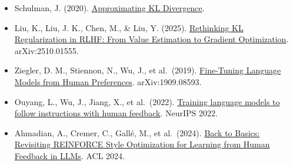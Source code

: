 \vspace{0.25em}
\begin{itemize}
\tightlist
\item
  Schulman, J. (2020). \href{http://joschu.net/blog/kl-approx.html}{Approximating KL Divergence}.
\item
  Liu, K., Liu, J. K., Chen, M., \& Liu, Y. (2025). \href{https://arxiv.org/abs/2510.01555}{Rethinking KL Regularization in RLHF: From Value Estimation to Gradient Optimization}. arXiv:2510.01555.
\item
  Ziegler, D. M., Stiennon, N., Wu, J., et al.~(2019). \href{https://arxiv.org/abs/1909.08593}{Fine-Tuning Language Models from Human Preferences}. arXiv:1909.08593.
\item
  Ouyang, L., Wu, J., Jiang, X., et al.~(2022). \href{https://arxiv.org/abs/2203.02155}{Training language models to follow instructions with human feedback}. NeurIPS 2022.
\item
  Ahmadian, A., Cremer, C., Gallé, M., et al.~(2024). \href{https://arxiv.org/abs/2402.14740}{Back to Basics: Revisiting REINFORCE Style Optimization for Learning from Human Feedback in LLMs}. ACL 2024.
\end{itemize}

\clearpage
